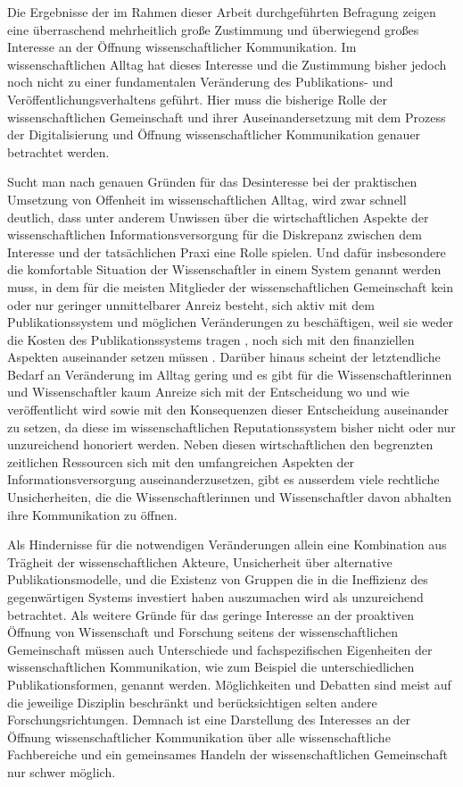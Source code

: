 Die Ergebnisse der im Rahmen dieser Arbeit durchgeführten Befragung zeigen eine überraschend mehrheitlich große Zustimmung und überwiegend großes Interesse an der Öffnung wissenschaftlicher Kommunikation. Im wissenschaftlichen Alltag hat dieses Interesse und die Zustimmung bisher jedoch noch nicht zu einer fundamentalen Veränderung des Publikations- und Veröffentlichungsverhaltens geführt. Hier muss die bisherige Rolle der wissenschaftlichen Gemeinschaft und ihrer Auseinandersetzung mit dem Prozess der Digitalisierung und Öffnung wissenschaftlicher Kommunikation genauer betrachtet werden.

Sucht man nach genauen Gründen für das Desinteresse bei der praktischen Umsetzung von Offenheit im wissenschaftlichen Alltag, wird zwar schnell deutlich, dass unter anderem Unwissen über die wirtschaftlichen Aspekte der wissenschaftlichen Informationsversorgung für die Diskrepanz zwischen dem Interesse und der tatsächlichen Praxi eine Rolle spielen. Und dafür insbesondere die komfortable Situation der Wissenschaftler in einem System genannt werden muss, in dem für die meisten Mitglieder der wissenschaftlichen Gemeinschaft kein oder nur geringer unmittelbarer Anreiz besteht, sich aktiv mit dem Publikationssystem und möglichen Veränderungen zu beschäftigen, weil sie weder die Kosten des Publikationssystems tragen \cite{Sietmann_oa_2007}, noch sich mit den finanziellen Aspekten auseinander setzen müssen \cite{herb_2010}. Darüber hinaus scheint der letztendliche Bedarf an Veränderung im Alltag gering und es gibt für die Wissenschaftlerinnen und Wissenschaftler kaum Anreize sich mit der Entscheidung wo und wie veröffentlicht wird sowie mit den Konsequenzen dieser Entscheidung auseinander zu setzen, da diese im wissenschaftlichen Reputationssystem bisher nicht oder nur unzureichend honoriert werden. Neben diesen wirtschaftlichen den begrenzten zeitlichen Ressourcen sich mit den umfangreichen Aspekten der Informationsversorgung auseinanderzusetzen, gibt es ausserdem viele rechtliche Unsicherheiten, die die Wissenschaftlerinnen und Wissenschaftler davon abhalten ihre Kommunikation zu öffnen.

Als Hindernisse für die notwendigen Veränderungen allein eine Kombination aus Trägheit der wissenschaftlichen Akteure, Unsicherheit über alternative Publikationsmodelle, und die Existenz von Gruppen die in die Ineffizienz des gegenwärtigen Systems investiert haben auszumachen \cite{nosek_2012_scientific} wird als unzureichend betrachtet. Als weitere Gründe für das geringe Interesse an der proaktiven Öffnung von Wissenschaft und Forschung seitens der wissenschaftlichen Gemeinschaft müssen auch Unterschiede und fachspezifischen Eigenheiten der wissenschaftlichen Kommunikation, wie zum Beispiel die unterschiedlichen Publikationsformen, genannt werden. Möglichkeiten und Debatten sind meist auf die jeweilige Disziplin beschränkt und berücksichtigen selten andere Forschungsrichtungen. Demnach ist eine Darstellung des Interesses an der Öffnung wissenschaftlicher Kommunikation über alle wissenschaftliche Fachbereiche und ein gemeinsames Handeln der wissenschaftlichen Gemeinschaft nur schwer möglich.

